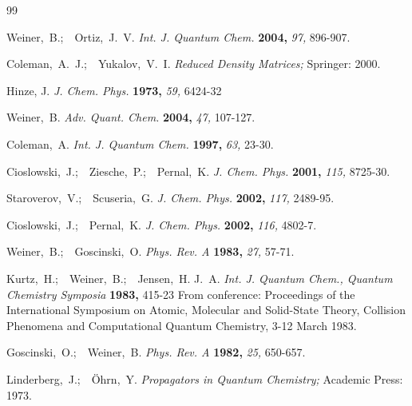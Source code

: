 \documentclass[aps,preprint]{revtex4}%
\begin{document}
\begin{thebibliography}{99}                                                                                               %


Weiner,~B.;\ \ Ortiz,~J.~V. \textit{Int. J. Quantum
Chem.} \textbf{2004,} \textsl{97,} 896-907.

Coleman,~A.~J.;\ \ Yukalov,~V.~I. \textit{Reduced Density
Matrices;} Springer: 2000.

Hinze, J. \textit{J. Chem. Phys.} \textbf{1973,} \textsl{59,} 6424-32

Weiner,~B. \textit{Adv. Quant. Chem.} \textbf{2004,}
\textsl{47,} 107-127.

Coleman,~A. \textit{Int. J. Quantum Chem.} \textbf{1997,}
\textsl{63,} 23-30.

Cioslowski,~J.;\ \ Ziesche,~P.;\ \ Pernal,~K.
\textit{J. Chem. Phys.} \textbf{2001,} \textsl{115,} 8725-30.

Staroverov,~V.;\ \ Scuseria,~G. \textit{J. Chem. Phys.}
\textbf{2002,} \textsl{117,} 2489-95.

Cioslowski,~J.;\ \ Pernal,~K. \textit{J. Chem. Phys.}
\textbf{2002,} \textsl{116,} 4802-7.

Weiner,~B.;\ \ Goscinski,~O. \textit{Phys. Rev. A}
\textbf{1983,} \textsl{27,} 57-71.

Kurtz,~H.;\ \ Weiner,~B.;\ \ Jensen,~H. J.~A. \textit{Int.
J. Quantum Chem., Quantum Chemistry Symposia} \textbf{1983,} 415-23 From
conference: Proceedings of the International Symposium on Atomic, Molecular
and Solid-State Theory, Collision Phenomena and Computational Quantum
Chemistry, 3-12 March 1983.

Goscinski,~O.;\ \ Weiner,~B. \textit{Phys. Rev. A}
\textbf{1982,} \textsl{25,} 650-657.

Linderberg,~J.;\ \ {\"{O}}hrn,~Y. \textit{Propagators in
Quantum Chemistry;} Academic Press: 1973.
\end{thebibliography}
\end{document}
